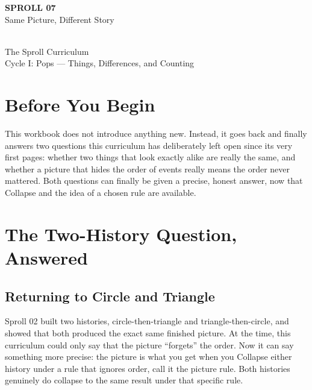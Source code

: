 \documentclass[11pt]{book}
\begin{document}
\begin{titlepage}
\centering
\vspace*{1.4in}
{\Huge \textbf{SPROLL 07}}\\[0.5in]
{\huge Same Picture, Different Story}\\[0.8in]
\\[0.8in]
{\Large The Sproll Curriculum}\\[0.2in]
{\large Cycle I: Pops --- Things, Differences, and Counting}
\end{titlepage}

\tableofcontents

\chapter*{Before You Begin}

This workbook does not introduce anything new. Instead, it goes back and finally answers two questions this curriculum has deliberately left open since its very first pages: whether two things that look exactly alike are really the same, and whether a picture that hides the order of events really means the order never mattered. Both questions can finally be given a precise, honest answer, now that Collapse and the idea of a chosen rule are available.

\chapter{The Two-History Question, Answered}

\section{Returning to Circle and Triangle}

Sproll 02 built two histories, circle-then-triangle and triangle-then-circle, and showed that both produced the exact same finished picture. At the time, this curriculum could only say that the picture ``forgets'' the order. Now it can say something more precise: the picture is what you get when you Collapse either history under a rule that ignores order, call it the picture rule. Both histories genuinely do collapse to the same result under that specific rule.
\end{document}
